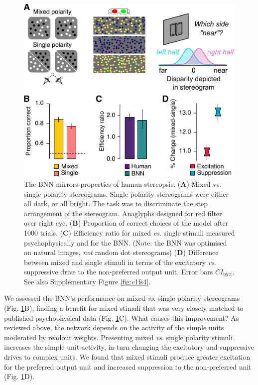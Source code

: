 {\begin{figure}[!h]
  \centering
  \includegraphics{chapter1/chapter1-figs/Fig5.pdf}
  \caption[The BNN mirrors properties of human stereopsis.]{ The BNN mirrors properties of human stereopsis. ({\bf A}) Mixed vs. single polarity stereograms. Single polarity stereograms were either all dark, or all bright. The task was to discriminate the step arrangement of the stereogram. Anaglyphs designed for red filter over right eye. ({\bf B}) Proportion of correct choices of the model after 1000 trials. ({\bf C}) Efficiency ratio for mixed {\it vs}. single stimuli measured psychophysically \cite{Harris:1995va} and for the BNN. (Note: the BNN was optimised on natural images, {\it not} random dot stereograms) ({\bf D}) Difference between mixed and single stimuli in terms of the excitatory {\it vs}. suppressive drive to the non-preferred output unit. Error bars $CI_{95\%}$. See also Supplementary Figure \ref{fig:c1fs4}.}
  \label{fig:c1f5}
\end{figure}

 We assessed the BNN's performance on mixed {\it vs}. single polarity stereograms (Fig. \ref{fig:c1f5}B), finding a benefit for mixed stimuli that was very closely matched to published psychophysical data \cite{Harris:1995va, Read:2011im} (Fig. \ref{fig:c1f5}C). What causes this improvement? As reviewed above, the network depends on the activity of the simple units moderated by readout weights. Presenting mixed {\it vs}. single polarity stimuli increases the simple unit activity, in turn changing the excitatory and suppressive drives to complex units. We found that mixed stimuli produce greater excitation for the preferred output unit and increased suppression to the non-preferred unit (Fig. \ref{fig:c1f5}D). 

}
